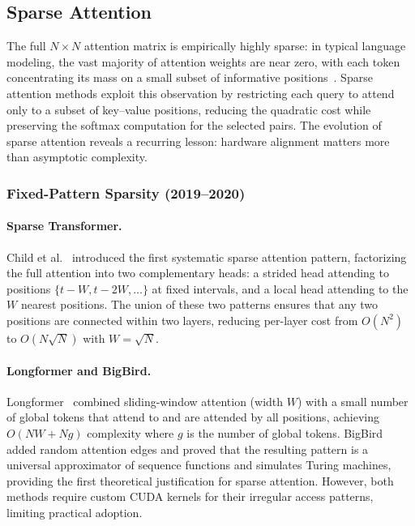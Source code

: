 \subsection{Sparse Attention}
\label{subsec:sparse}
The full $N \times N$ attention matrix is empirically highly sparse: in typical language modeling, the vast majority of attention weights are near zero, with each token concentrating its mass on a small subset of informative positions~\cite{child2019generating}. Sparse attention methods exploit this observation by restricting each query to attend only to a subset of key--value positions, reducing the quadratic cost while preserving the softmax computation for the selected pairs. The evolution of sparse attention reveals a recurring lesson: hardware alignment matters more than asymptotic complexity.

\subsubsection{Fixed-Pattern Sparsity (2019--2020)}

\paragraph{Sparse Transformer.}
Child et al.~\cite{child2019generating} introduced the first systematic sparse attention pattern, factorizing the full attention into two complementary heads: a strided head attending to positions $\{t - W, t - 2W, \ldots\}$ at fixed intervals, and a local head attending to the $W$ nearest positions. The union of these two patterns ensures that any two positions are connected within two layers, reducing per-layer cost from $O(N^2)$ to $O(N\sqrt{N})$ with $W = \sqrt{N}$.

\paragraph{Longformer and BigBird.}
Longformer~\cite{beltagy2020longformer} combined sliding-window attention (width $W$) with a small number of global tokens that attend to and are attended by all positions, achieving $O(NW + Ng)$ complexity where $g$ is the number of global tokens. BigBird~\cite{zaheer2020big} added random attention edges and proved that the resulting pattern is a universal approximator of sequence functions and simulates Turing machines, providing the first theoretical justification for sparse attention. However, both methods require custom CUDA kernels for their irregular access patterns, limiting practical adoption.

